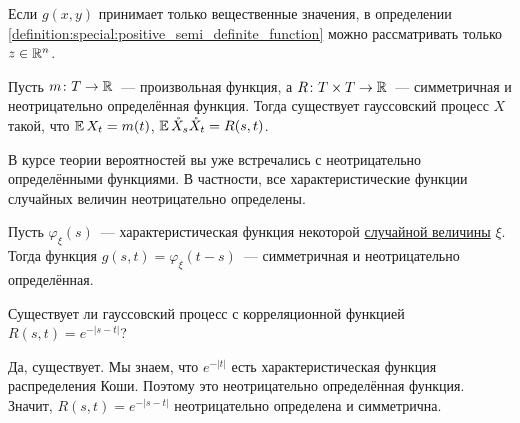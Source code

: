 \begin{remark}
    \label{remark:special:positive_semi_definite_function_for_reals}
    Если $ g(x, y) $ принимает только вещественные значения,
    в определении \ref{definition:special:positive_semi_definite_function} можно рассматривать только $ z \in \mathbb{R}^n $.
\end{remark}

\begin{statement}
    \label{statement:special:mean_and_cov_define_gaussian_process}
    Пусть $ m \colon T \to \mathbb{R} $~--- произвольная функция,
    а $ R \colon T \times T \to \mathbb{R} $~--- симметричная и неотрицательно определённая функция.
    Тогда существует гауссовский процесс $ X $ такой, что $ \operatorname{\mathbb{E}} X_t = m(t) $, $ \operatorname{\mathbb{E}} \mathring{X}_s \mathring{X}_t = R(s, t) $.
\end{statement}

В курсе теории вероятностей вы уже встречались с неотрицательно определёнными функциями.
В частности, все характеристические функции случайных величин неотрицательно определены.

\begin{statement}
    \label{statement:special:characteristic_function_is_positive_semi_definite}
    Пусть $ \varphi_\xi(s) $~--- характеристическая функция некоторой \uline{случайной величины} $ \xi $.
    Тогда функция $ g(s, t) = \varphi_\xi(t - s) $~--- симметричная и неотрицательно определённая.
\end{statement}


\begin{Exercise}[counter=SecExercise, label={exercise:special:gaussian_from_characteristic_function_of_Cauchy}]
    \noindent
    Существует ли гауссовский процесс с корреляционной функцией $ R(s, t) = e^{-|s - t|} $?
\end{Exercise}

\begin{Answer}
    \noindent
    Да, существует.
    Мы знаем, что $e^{-|t|} $ есть характеристическая функция распределения Коши.
    Поэтому это неотрицательно определённая функция.
    Значит, $ R(s, t) = e^{-|s - t|} $ неотрицательно определена и симметрична.
\end{Answer}


